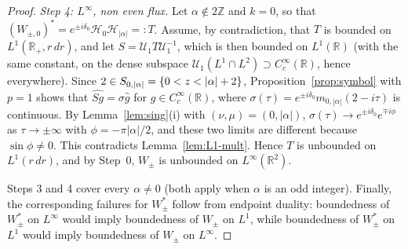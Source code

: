 \documentclass[11pt,a4paper,reqno,backref=page]{amsart}
\newcommand{\R}{\mathbb R}
\newcommand{\Z}{\mathbb Z}
\newcommand{\HH}{\mathcal H}                 %
\let\Re\relax\DeclareMathOperator{\Re}{Re}
\numberwithin{equation}{section}
\theoremstyle{definition}
\theoremstyle{remark}
\begin{document}
\begin{proof}
\emph{Step 4: $L^\infty$, non even flux.} Let $\alpha\notin2\Z$
and $k=0$, so that $(W_{\pm,0})^*=e^{\pm
i\delta_0}\HH_0\HH_{|\alpha|}=:T$. Assume, by contradiction,
that $T$ is bounded on $L^1(\R_+,r\,dr)$, and let $S=\mathcal
U_1T\mathcal U_1^{-1}$, which is then bounded on $L^1(\R)$ (with
the same constant, on the dense subspace $\mathcal U_1(L^1\cap
L^2)\supset C_c^\infty(\R)$, hence everywhere). Since $2\in
S_{0,|\alpha|}=\{0<\Re z<|\alpha|+2\}$,
Proposition~\ref{prop:symbol} with $p=1$ shows that
$\widehat{Sg}=\sigma\widehat g$ for $g\in C_c^\infty(\R)$, where
$\sigma(\tau)=e^{\pm i\delta_0}m_{0,|\alpha|}(2-i\tau)$ is
continuous. By Lemma~\ref{lem:sing}(i) with
$(\nu,\mu)=(0,|\alpha|)$, $\sigma(\tau)\to e^{\pm
i\delta_0}e^{\mp i\phi}$ as $\tau\to\pm\infty$ with
$\phi=-\pi|\alpha|/2$, and these two limits are different
because $\sin\phi\ne0$. This contradicts
Lemma~\ref{lem:L1-mult}. Hence $T$ is unbounded on $L^1(r\,dr)$,
and by Step~0, $W_\pm$ is unbounded on $L^\infty(\R^2)$.

Steps 3 and 4 cover every $\alpha\ne0$ (both apply when $\alpha$
is an odd integer). Finally, the corresponding failures for
$W_\pm^*$ follow from endpoint duality: boundedness of $W_\pm^*$
on $L^\infty$ would imply boundedness of $W_\pm$ on $L^1$, while
boundedness of $W_\pm^*$ on $L^1$ would imply boundedness of
$W_\pm$ on $L^\infty$.
\end{proof}
\end{document}
